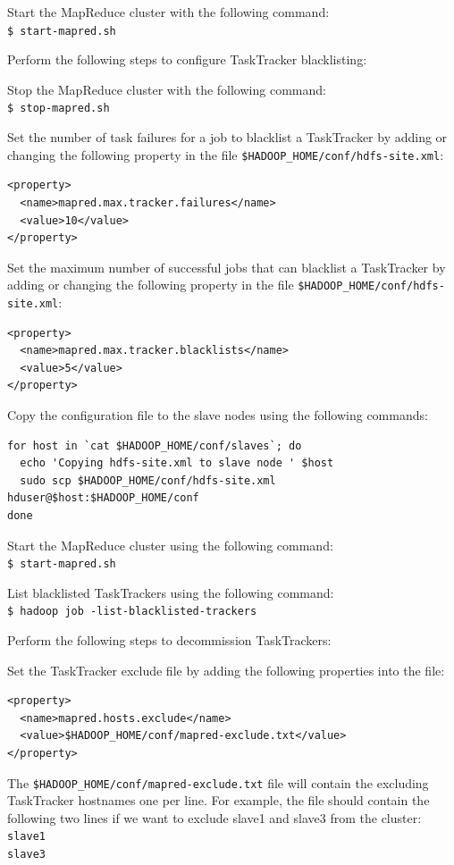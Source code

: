 Start the MapReduce cluster with the following command: \\
\verb|$ start-mapred.sh|

Perform the following steps to configure TaskTracker blacklisting:

Stop the MapReduce cluster with the following command: \\
\verb|$ stop-mapred.sh|

Set the number of task failures for a job to blacklist a TaskTracker by adding or changing the following property in the file \verb|$HADOOP_HOME/conf/hdfs-site.xml|:
\begin{verbatim} 
<property>
  <name>mapred.max.tracker.failures</name>
  <value>10</value>
</property>
\end{verbatim}

Set the maximum number of successful jobs that can blacklist a TaskTracker by adding or changing the following property in the file \verb|$HADOOP_HOME/conf/hdfs-site.xml|:
\begin{verbatim} 
<property>
  <name>mapred.max.tracker.blacklists</name>
  <value>5</value>
</property>
\end{verbatim}

Copy the configuration file to the slave nodes using the following commands:
\begin{verbatim} 
for host in `cat $HADOOP_HOME/conf/slaves`; do
  echo 'Copying hdfs-site.xml to slave node ' $host
  sudo scp $HADOOP_HOME/conf/hdfs-site.xml hduser@$host:$HADOOP_HOME/conf
done
\end{verbatim}

Start the MapReduce cluster using the following command: \\
\verb|$ start-mapred.sh|

List blacklisted TaskTrackers using the following command: \\
\verb|$ hadoop job -list-blacklisted-trackers|

Perform the following steps to decommission TaskTrackers: 

Set the TaskTracker exclude file by adding the following properties into the file:
\begin{verbatim}
<property>
  <name>mapred.hosts.exclude</name>
  <value>$HADOOP_HOME/conf/mapred-exclude.txt</value>
</property>
\end{verbatim}

The \verb|$HADOOP_HOME/conf/mapred-exclude.txt| file will contain the excluding TaskTracker hostnames one per line. For example, the file should contain the following two lines if we want to exclude slave1 and slave3 from the cluster: \\
\verb|slave1| \\
\verb|slave3| 

